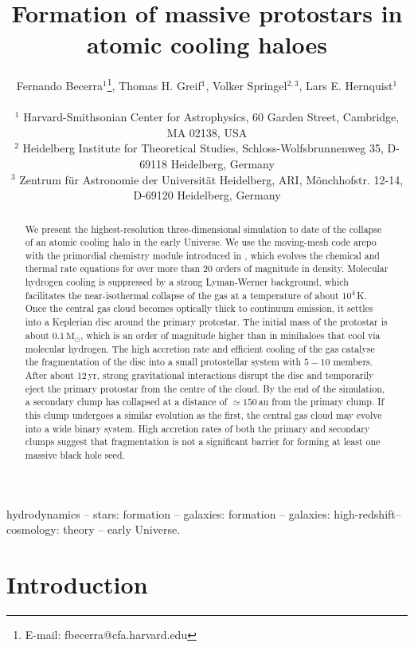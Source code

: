 \documentclass[useAMS,usenatbib]{mnras}
\title[Massive protostars in atomic cooling haloes]{Formation of massive protostars in atomic cooling haloes}
\author[Becerra et al.]{\parbox{17.5cm}{Fernando Becerra$^1$\thanks{E-mail: fbecerra@cfa.harvard.edu}, Thomas H. Greif$^1$, Volker Springel$^{2,3}$, Lars E. Hernquist$^1$}
\\$^1$ Harvard-Smithsonian Center for Astrophysics, 60 Garden Street, Cambridge, MA 02138, USA
\\$^2$ Heidelberg Institute for Theoretical Studies, Schloss-Wolfsbrunnenweg 35, D-69118 Heidelberg, Germany
\\$^3$ Zentrum f\"ur Astronomie der Universit\"at Heidelberg, ARI, M\"onchhofstr. 12-14, D-69120 Heidelberg, Germany}
\newcommand{\msun}{\text{M}_\odot}
\begin{document}
\maketitle
\topmargin-1cm

\begin{abstract}
We present the highest-resolution three-dimensional simulation to date of the collapse of an atomic cooling halo in the early Universe. We use the moving-mesh code {\sc arepo} with the primordial chemistry module introduced in \citet{Greif_2014}, which evolves the chemical and thermal rate equations for over more than 20 orders of magnitude in density. Molecular hydrogen cooling is suppressed by a strong Lyman-Werner background, which facilitates the near-isothermal collapse of the gas at a temperature of about $10^4\,$K. Once the central gas cloud becomes optically thick to continuum emission, it settles into a Keplerian disc around the primary protostar. The initial mass of the protostar is about $0.1\,\msun$, which is an order of magnitude higher than in minihaloes that cool via molecular hydrogen. The high accretion rate and efficient cooling of the gas catalyse the fragmentation of the disc into a small protostellar system with $5-10$ members. After about $12\,$yr, strong gravitational interactions disrupt the disc and temporarily eject the primary protostar from the centre of the cloud. By the end of the simulation, a secondary clump has collapsed at a distance of $\simeq 150\,$au from the primary clump. If this clump undergoes a similar evolution as the first, the central gas cloud may evolve into a wide binary system. High accretion rates of both the primary and secondary clumps suggest that fragmentation is not a significant barrier for forming at least one massive black hole seed.
\end{abstract}

\begin{keywords}
hydrodynamics -- stars: formation -- galaxies: formation -- galaxies: high-redshift-- cosmology: theory -- early Universe.
\end{keywords}

\section{Introduction}
\label{sec:intro}
\end{document}
